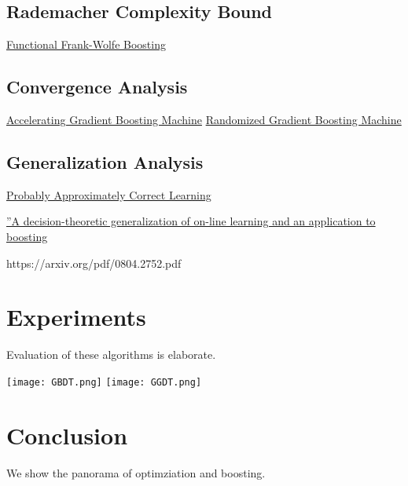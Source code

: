 \documentclass[UTF8]{article}
\begin{document}
\subsection{Rademacher Complexity Bound}

\href{https://arxiv.org/pdf/1510.02558.pdf}{Functional Frank-Wolfe Boosting}

\subsection{Convergence Analysis}

\href{https://arxiv.org/pdf/1903.08708.pdf}{Accelerating Gradient Boosting Machine}
\href{http://web.mit.edu/haihao/www/papers/RGBM.pdf}{Randomized Gradient Boosting Machine}

\subsection{Generalization Analysis}

\href{https://jeremykun.com/2014/01/02/probably-approximately-correct-a-formal-theory-of-learning/}{Probably Approximately Correct Learning}

\href{http://students.cse.tamu.edu/xingwang/courses/ece689607/regret_boost.pdf}{”A decision-theoretic generalization of on-line learning and an application to boosting}

https://arxiv.org/pdf/0804.2752.pdf

\section{Experiments}

Evaluation of these algorithms is elaborate.

  \texttt{[image: GBDT.png]}
  \texttt{[image: GGDT.png]}

\section{Conclusion}

We show the panorama of optimziation and boosting.



\end{document}
